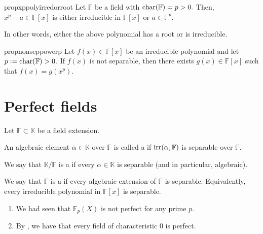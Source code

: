 \begin{restatable}[]{prop}{xppolyirredorroot}
\label{prop:xppolyirredorroot}
    Let $\mathbb{F}$ be a field with $\operatorname{char}(\mathbb{F}) = p > 0.$ Then, $x^p - a \in \mathbb{F}[x]$ is either irreducible in $\mathbb{F}[x]$ or $a \in \mathbb{F}^p.$ \hfill\hyperref[prop:xppolyirredorroot2]{\downsym}
\end{restatable}

In other words, either the above polynomial has a root or is irreducible.

\begin{restatable}[]{prop}{nonseppowerp}
\label{prop:nonseppowerp}
    Let $f(x) \in \mathbb{F}[x]$ be an irreducible polynomial and let $p \vcentcolon= \operatorname{char}(\mathbb{F}) > 0.$ If $f(x)$ is not separable, then there exists $g(x) \in \mathbb{F}[x]$ such that $f(x) = g(x^p).$ \hfill\hyperref[prop:nonseppowerp2]{\downsym}
\end{restatable}

\section{Perfect fields}
\begin{defn}%
    Let $\mathbb{F} \subset \mathbb{K}$ be a field extension. 

    An algebraic element $\alpha \in \mathbb{K}$ over $\mathbb{F}$ is called a  if $\operatorname{irr}(\alpha, \mathbb{F})$ is separable over $\mathbb{F}.$

    We say that $\mathbb{K}/\mathbb{F}$ is a  if every $\alpha \in \mathbb{K}$ is separable (and in particular, algebraic). 

    We say that $\mathbb{F}$ is a  if every algebraic extension of $\mathbb{F}$ is separable. Equivalently, every irreducible polynomial in $\mathbb{F}[x]$ is separable.
\end{defn}

\begin{ex}
    \phantom{hi}
    \begin{enumerate}
        \item We had seen that $\mathbb{F}_p(X)$ is not perfect for any prime $p.$
        \item By , we have that every field of characteristic $0$ is perfect.
    \end{enumerate}
\end{ex}

